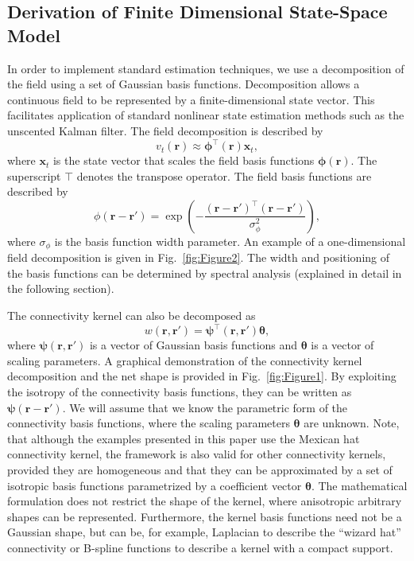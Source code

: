 \documentclass[review,authoryear,3p]{elsarticle}
\begin{document}
\subsection{Derivation of Finite Dimensional State-Space Model}\label{Sect:ReducedModelDerivation}
In order to implement standard estimation techniques, we use a decomposition of the field using a set of Gaussian basis functions. Decomposition allows a continuous field to be represented by a finite-dimensional state vector. This facilitates application of standard nonlinear state estimation methods such as the unscented Kalman filter. The field decomposition is described by
\begin{equation}
	\label{DefFieldDecomp} v_t\left(\mathbf{r}\right) \approx \boldsymbol{\phi}^{\top}\left(\mathbf{r}\right) \mathbf{x}_t, 
\end{equation}
where $\mathbf{x}_t$ is the state vector that scales the field basis functions $\mathbf{\boldsymbol{\phi}}(\mathbf{r})$. The superscript $\top$ denotes the transpose operator. The field basis functions are described by
\begin{equation}\label{eq:FieldBasisFunction}
	\phi\left(\mathbf{r}-\mathbf{r}'\right) =
\exp{\left(-\frac{(\mathbf{r}-\mathbf{r}')^\top(\mathbf{r}-\mathbf{r}')}{\sigma_{\phi}^2}\right)}, 
\end{equation}
where $\sigma_{\phi}$ is the basis function width parameter. An example of a one-dimensional field decomposition is given in Fig.~\ref{fig:Figure2}. The width and positioning of the basis functions can be determined by spectral analysis (explained in detail in the following section). 

The connectivity kernel can also be decomposed as 
\begin{equation}\label{DefKernelDecomp}
	 w\left(\mathbf{r},\mathbf{r}'\right) =\boldsymbol{\psi}^\top\left(\mathbf{r},\mathbf{r}'\right) \boldsymbol{\theta},
\end{equation}
where $\boldsymbol{\psi}(\mathbf{r},\mathbf{r}')$ is a vector of Gaussian basis functions and $\boldsymbol{\theta}$ is a vector of scaling parameters. A graphical demonstration of the connectivity kernel decomposition and the net shape is provided in Fig.~\ref{fig:Figure1}. By exploiting the isotropy of the connectivity basis functions, they can be written as  
$\boldsymbol{\psi}(\mathbf{r}-\mathbf{r}')$. We will assume that we know the parametric form of the connectivity basis functions, where the scaling parameters $\boldsymbol{\theta}$ are unknown. 
Note, that although the examples presented in this paper use the Mexican hat connectivity kernel, the framework is also valid for other connectivity kernels, provided they are homogeneous and that they can be approximated by a set of isotropic basis functions parametrized by a coefficient vector $\mathbf{\theta}$. The mathematical formulation does not restrict the shape of the kernel, where anisotropic arbitrary shapes can be represented. Furthermore, the kernel basis functions need not be a Gaussian shape, but can be, for example, Laplacian to describe the ``wizard hat'' connectivity or B-spline functions to describe a kernel with a compact support.
\end{document}
